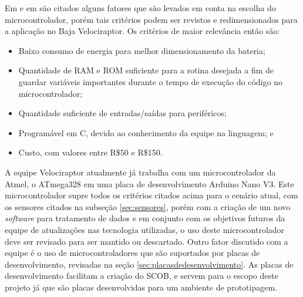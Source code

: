 Em  e em  são citados alguns fatores que são levados em conta na escolha do microcontrolador, porém tais critérios podem ser revistos e redimensionados para a aplicação no Baja Velociraptor. Os critérios de maior relevância então são:

\begin{itemize}
	\item Baixo consumo de energia para melhor dimensionamento da bateria;
	\item Quantidade de RAM e ROM suficiente para a rotina desejada a fim de guardar variáveis importantes durante o tempo de execução do código no microcontrolador;
	\item Quantidade suficiente de entradas/saídas para periféricos; 
	\item Programável em C, devido ao conhecimento da equipe na linguagem; e
	\item Custo, com valores entre R\$50 e R\$150.
\end{itemize}   

A equipe Velociraptor atualmente já trabalha com um microcontrolador da Atmel, o ATmega328 em uma placa de desenvolvimento Arduino Nano V3. Este microcontrolador supre todos os critérios citados acima para o cenário atual, com os sensores citados na subseção \ref{sec:sensores}, porém com a criação de um novo \textit{software} para tratamento de dados e em conjunto com os objetivos futuros da equipe de atualizações nas tecnologia utilizadas, o uso deste microcontrolador deve ser revisado para ser mantido ou descartado. Outro fator discutido com a equipe é o uso de microcontroladores que são suportados por placas de desenvolvimento, revisadas na seção \ref{sec:placasdedesenvolvimento}. As placas de desenvolvimento facilitam a criação do SCOB, e servem para o escopo deste projeto já que são placas desenvolvidas para um ambiente de prototipagem. 

